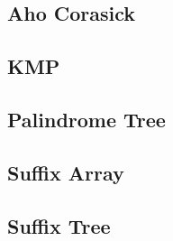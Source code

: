 \subsection{Aho Corasick}
\raggedbottom
\subsection{KMP}
\raggedbottom
\subsection{Palindrome Tree}
\raggedbottom
\subsection{Suffix Array}
\raggedbottom
\subsection{Suffix Tree}
\raggedbottom

